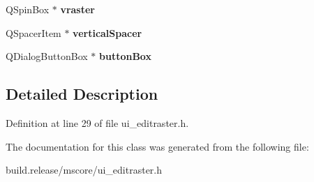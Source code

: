 \begin{DoxyCompactItemize}
\item 
\mbox{\label{class_ui___edit_raster_a27259f039982b1481a0f71c28155fe47}} 
Q\+Spin\+Box $\ast$ {\bfseries vraster}
\item 
\mbox{\label{class_ui___edit_raster_ac8cf84378a22e3b51538b37c6a621456}} 
Q\+Spacer\+Item $\ast$ {\bfseries vertical\+Spacer}
\item 
\mbox{\label{class_ui___edit_raster_a9d8c7d5c6aa0dff5747e2f6750401931}} 
Q\+Dialog\+Button\+Box $\ast$ {\bfseries button\+Box}
\end{DoxyCompactItemize}


\subsection{Detailed Description}


Definition at line 29 of file ui\+\_\+editraster.\+h.



The documentation for this class was generated from the following file\+:\begin{DoxyCompactItemize}
\item 
build.\+release/mscore/ui\+\_\+editraster.\+h\end{DoxyCompactItemize}
